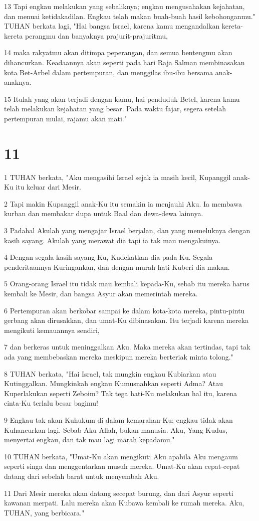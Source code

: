 \par 13 Tapi engkau melakukan yang sebaliknya; engkau mengusahakan kejahatan, dan menuai ketidakadilan. Engkau telah makan buah-buah hasil kebohonganmu." TUHAN berkata lagi, "Hai bangsa Israel, karena kamu mengandalkan kereta-kereta perangmu dan banyaknya prajurit-prajuritmu,
\par 14 maka rakyatmu akan ditimpa peperangan, dan semua bentengmu akan dihancurkan. Keadaannya akan seperti pada hari Raja Salman membinasakan kota Bet-Arbel dalam pertempuran, dan menggilas ibu-ibu bersama anak-anaknya.
\par 15 Itulah yang akan terjadi dengan kamu, hai penduduk Betel, karena kamu telah melakukan kejahatan yang besar. Pada waktu fajar, segera setelah pertempuran mulai, rajamu akan mati."

\chapter{11}

\par 1 TUHAN berkata, "Aku mengasihi Israel sejak ia masih kecil, Kupanggil anak-Ku itu keluar dari Mesir.
\par 2 Tapi makin Kupanggil anak-Ku itu semakin ia menjauhi Aku. Ia membawa kurban dan membakar dupa untuk Baal dan dewa-dewa lainnya.
\par 3 Padahal Akulah yang mengajar Israel berjalan, dan yang memeluknya dengan kasih sayang. Akulah yang merawat dia tapi ia tak mau mengakuinya.
\par 4 Dengan segala kasih sayang-Ku, Kudekatkan dia pada-Ku. Segala penderitaannya Kuringankan, dan dengan murah hati Kuberi dia makan.
\par 5 Orang-orang Israel itu tidak mau kembali kepada-Ku, sebab itu mereka harus kembali ke Mesir, dan bangsa Asyur akan memerintah mereka.
\par 6 Pertempuran akan berkobar sampai ke dalam kota-kota mereka, pintu-pintu gerbang akan dirusakkan, dan umat-Ku dibinasakan. Itu terjadi karena mereka mengikuti kemauannya sendiri,
\par 7 dan berkeras untuk meninggalkan Aku. Maka mereka akan tertindas, tapi tak ada yang membebaskan mereka meskipun mereka berteriak minta tolong."
\par 8 TUHAN berkata, "Hai Israel, tak mungkin engkau Kubiarkan atau Kutinggalkan. Mungkinkah engkau Kumusnahkan seperti Adma? Atau Kuperlakukan seperti Zeboim? Tak tega hati-Ku melakukan hal itu, karena cinta-Ku terlalu besar bagimu!
\par 9 Engkau tak akan Kuhukum di dalam kemarahan-Ku; engkau tidak akan Kuhancurkan lagi. Sebab Aku Allah, bukan manusia. Aku, Yang Kudus, menyertai engkau, dan tak mau lagi marah kepadamu."
\par 10 TUHAN berkata, "Umat-Ku akan mengikuti Aku apabila Aku mengaum seperti singa dan menggentarkan musuh mereka. Umat-Ku akan cepat-cepat datang dari sebelah barat untuk menyembah Aku.
\par 11 Dari Mesir mereka akan datang secepat burung, dan dari Asyur seperti kawanan merpati. Lalu mereka akan Kubawa kembali ke rumah mereka. Aku, TUHAN, yang berbicara."

